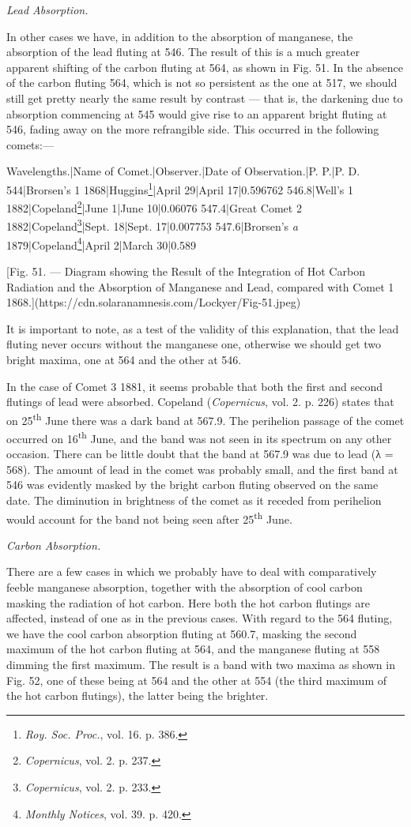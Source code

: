 \documentclass[a4paper, 12pt, oneside, polutonikogreek, english]{article}
\begin{document}
\emph{Lead Absorption.}

In other cases we have, in addition to the absorption of manganese, the absorption of the lead fluting at 546. The result of this is a much greater apparent shifting of the carbon fluting at 564, as shown in Fig. 51. In the absence of the carbon fluting 564, which is not so persistent as the one at 517, we should still get pretty nearly the same result by contrast --- that is, the darkening due to absorption commencing at 545 would give rise to an apparent bright fluting at 546, fading away on the more refrangible side. This occurred in the following comets:---

Wavelengths.|Name of Comet.|Observer.|Date of Observation.|P. P.|P. D. 
544|Brorsen's 1 1868|Huggins\footnote{\emph{Roy. Soc. Proc.}, vol. 16. p. 386.}|April 29|April 17|0.596762 
546.8|Well's 1 1882|Copeland\footnote{\emph{Copernicus}, vol. 2. p. 237.}|June 1|June 10|0.06076 
547.4|Great Comet 2 1882|Copeland\footnote{\emph{Copernicus}, vol. 2. p. 233.}|Sept. 18|Sept. 17|0.007753 
547.6|Brorsen's \emph{a} 1879|Copeland\footnote{\emph{Monthly Notices}, vol. 39. p. 420.}|April 2|March 30|0.589

[Fig. 51. --- Diagram showing the Result of the Integration of Hot Carbon Radiation and the Absorption of Manganese and Lead, compared with Comet 1 1868.](https://cdn.solaranamnesis.com/Lockyer/Fig-51.jpeg)

It is important to note, as a test of the validity of this explanation, that the lead fluting never occurs without the manganese one, otherwise we should get two bright maxima, one at 564 and the other at 546.

In the case of Comet 3 1881, it seems probable that both the first and second flutings of lead were absorbed. Copeland (\emph{Copernicus}, vol. 2. p. 226) states that on 25\textsuperscript{th} June there was a dark band at 567.9. The perihelion passage of the comet occurred on 16\textsuperscript{th} June, and the band was not seen in its spectrum on any other occasion. There can be little doubt that the band at 567.9 was due to lead (λ = 568). The amount of lead in the comet was probably small, and the first band at 546 was evidently masked by the bright carbon fluting observed on the same date. The diminution in brightness of the comet as it receded from perihelion would account for the band not being seen after 25\textsuperscript{th} June.

\emph{Carbon Absorption.}

There are a few cases in which we probably have to deal with comparatively feeble manganese absorption, together with the absorption of cool carbon masking the radiation of hot carbon. Here both the hot carbon flutings are affected, instead of one as in the previous cases. With regard to the 564 fluting, we have the cool carbon absorption fluting at 560.7, masking the second maximum of the hot carbon fluting at 564, and the manganese fluting at 558 dimming the first maximum. The result is a band with two maxima as shown in Fig. 52, one of these being at 564 and the other at 554 (the third maximum of the hot carbon flutings), the latter being the brighter.
\end{document}
